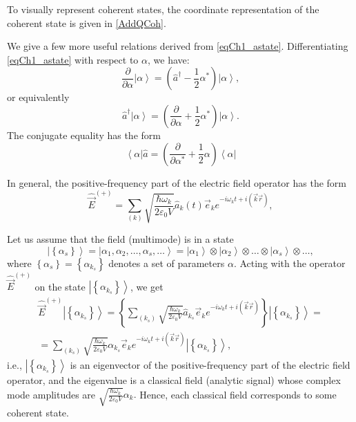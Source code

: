 To visually represent coherent states, the coordinate representation of the coherent state is given in \autoref{AddQCoh}. 

We give a few more useful relations derived from
\eqref{eqCh1_astate}. Differentiating \eqref{eqCh1_astate} with respect to $\alpha$,
we have:  
\[
\frac{\partial}{\partial \alpha}\left|\alpha\right> = 
\left( \hat{a}^{\dag} - \frac{1}{2}\alpha^{*}\right)\left|\alpha\right>,
\]
or equivalently 
\[
\hat{a}^{\dag}\left|\alpha\right> = \left(\frac{\partial}{\partial
  \alpha} +  \frac{1}{2}\alpha^{*}\right)\left|\alpha\right>.
\]
The conjugate equality has the form
\[
\left<\alpha\right|\hat{a} = \left(\frac{\partial}{\partial
  \alpha^{*}} +  \frac{1}{2}\alpha\right)\left<\alpha\right|
\]

In general, the positive-frequency part of the electric field operator has the form
\[
\hat{\vec{E}}^{(+)} = \sum_{(k)} \sqrt{\frac{\hbar \omega_k}{2 \varepsilon_0
V}} \hat{a}_k\left(t\right) \vec{e}_k e^{-i \omega_k t + i \left(\vec{k}\vec{r}
  \right)}, 
\]

Let us assume that the field (multimode) is in a state
\[
\left| \left\{\alpha_s\right\}\right> = 
\left| \alpha_1, \alpha_2, \dots, \alpha_s, \dots\right> = 
\left| \alpha_1\right>
\otimes
\left| \alpha_2\right>
\otimes
\dots
\otimes
\left| \alpha_s\right>
\otimes
\dots,
\]
where $\left\{\alpha_s\right\}= \left\{\alpha_{k_s}\right\}$
denotes a set of parameters $\alpha$. Acting with the operator $\hat{\vec{E}}^{(+)}$ on the state  $\left|\left\{\alpha_{k_s}\right\}\right>$, we get 
\begin{eqnarray}
\hat{\vec{E}}^{(+)}\left|\left\{\alpha_{k_s}\right\}\right> = 
\left\{ \sum_{(k_s)} \sqrt{\frac{\hbar \omega_k}{2 \varepsilon_0
V}} \hat{a}_{k_s} \vec{e}_k e^{-i \omega_k t + i \left(\vec{k}\vec{r}
  \right)}\right\}\left|\left\{\alpha_{k_s}\right\}\right> = 
\nonumber \\
= 
\sum_{(k_s)} \sqrt{\frac{\hbar \omega_k}{2 \varepsilon_0
V}} \alpha_{k_s} \vec{e}_k e^{-i \omega_k t + i \left(\vec{k}\vec{r}
  \right)}\left|\left\{\alpha_{k_s}\right\}\right>,
\end{eqnarray}
i.e., $\left|\left\{\alpha_{k_s}\right\}\right>$ is an eigenvector of the positive-frequency part of the electric field operator, and the eigenvalue is a classical field (analytic signal) whose complex mode amplitudes are  
\(
\sqrt{\frac{\hbar \omega_k}{2 \varepsilon_0
V}} \alpha_k.
\)
Hence, each classical field corresponds to some coherent state. 

